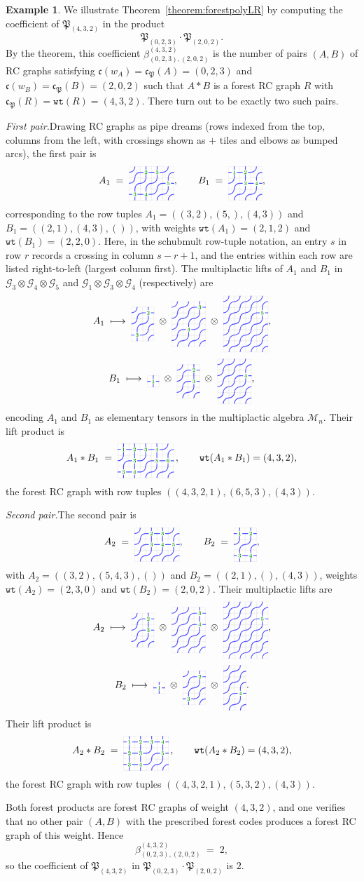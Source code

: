 \documentclass{amsart}
\theoremstyle{definition}
\newtheorem{example}[lemma]{Example}
\theoremstyle{remark}
\numberwithin{equation}{subsection}
\newcommand{\wof}[1]{w_{#1}}
\newcommand{\wtt}{\mathtt{wt}}
\newcommand{\grass}{\mathcal{G}}
\newcommand{\code}{\mathfrak{c}}
\newcommand{\forest}{\mathfrak{P}}
\begin{document}
\begin{example}\label{example:forestlrproduct}
We illustrate Theorem~\ref{theorem:forestpolyLR} by computing the coefficient of $\forest_{(4,3,2)}$ in the product
$$\forest_{(0,2,3)}\cdot\forest_{(2,0,2)}.$$
By the theorem, this coefficient $\beta_{(0,2,3),(2,0,2)}^{(4,3,2)}$ is the number of pairs $(A,B)$ of RC graphs satisfying $\code(\wof{A})=\code_\forest(A)=(0,2,3)$ and $\code(\wof{B})=\code_\forest(B)=(2,0,2)$ such that $A*B$ is a forest RC graph $R$ with $\code_\forest(R)=\wtt(R)=(4,3,2)$. There turn out to be exactly two such pairs.

\smallskip
\noindent\emph{First pair.}\quad Drawing RC graphs as pipe dreams (rows indexed from the top, columns from the left, with crossings shown as $+$ tiles and elbows as bumped arcs), the first pair is
$$A_1 \;=\; \pd{3}{4}{1/2,1/3,2/4,3/1,3/2}, \qquad B_1 \;=\; \pd{3}{3}{1/1,1/2,2/2,2/3},$$
corresponding to the row tuples $A_1=((3,2),(5,),(4,3))$ and $B_1=((2,1),(4,3),())$, with weights $\wtt(A_1)=(2,1,2)$ and $\wtt(B_1)=(2,2,0)$. Here, in the schubmult row-tuple notation, an entry $s$ in row $r$ records a crossing in column $s-r+1$, and the entries within each row are listed right-to-left (largest column first). The multiplactic lifts of $A_1$ and $B_1$ in $\grass_3\otimes\grass_4\otimes\grass_5$ and $\grass_1\otimes\grass_3\otimes\grass_4$ (respectively) are
$$A_1 \;\longmapsto\; \pd{3}{2}{1/2,3/1}\;\otimes\;\pd{4}{3}{1/3,3/2}\;\otimes\;\pd{5}{4}{2/4},$$
$$B_1 \;\longmapsto\; \pd{1}{1}{1/1}\;\otimes\;\pd{3}{2}{1/2,2/2}\;\otimes\;\pd{4}{3}{2/3},$$
encoding $A_1$ and $B_1$ as elementary tensors in the multiplactic algebra $\mathcal{M}_n$. Their lift product is
$$A_1 * B_1 \;=\; \pd{3}{5}{1/1,1/2,1/3,1/4,2/2,2/4,2/5,3/1,3/2}\,, \qquad \wtt(A_1*B_1)=(4,3,2),$$
the forest RC graph with row tuples $((4,3,2,1),(6,5,3),(4,3))$.

\smallskip
\noindent\emph{Second pair.}\quad The second pair is
$$A_2 \;=\; \pd{3}{4}{1/2,1/3,2/2,2/3,2/4}, \qquad B_2 \;=\; \pd{3}{2}{1/1,1/2,3/1,3/2},$$
with $A_2=((3,2),(5,4,3),())$ and $B_2=((2,1),(),(4,3))$, weights $\wtt(A_2)=(2,3,0)$ and $\wtt(B_2)=(2,0,2)$. Their multiplactic lifts are
$$A_2 \;\longmapsto\; \pd{3}{2}{1/2,2/2}\;\otimes\;\pd{4}{3}{1/3,2/3}\;\otimes\;\pd{5}{4}{2/4},$$
$$B_2 \;\longmapsto\; \pd{1}{1}{1/1}\;\otimes\;\pd{3}{2}{1/2,3/1}\;\otimes\;\pd{4}{2}{3/2}.$$
Their lift product is
$$A_2 * B_2 \;=\; \pd{3}{4}{1/1,1/2,1/3,1/4,2/1,2/2,2/4,3/1,3/2}\,, \qquad \wtt(A_2*B_2)=(4,3,2),$$
the forest RC graph with row tuples $((4,3,2,1),(5,3,2),(4,3))$.

\smallskip
Both forest products are forest RC graphs of weight $(4,3,2)$, and one verifies that no other pair $(A,B)$ with the prescribed forest codes produces a forest RC graph of this weight. Hence
$$\beta_{(0,2,3),(2,0,2)}^{(4,3,2)} \;=\; 2,$$
so the coefficient of $\forest_{(4,3,2)}$ in $\forest_{(0,2,3)}\cdot\forest_{(2,0,2)}$ is $2$.

\end{example}
\end{document}
